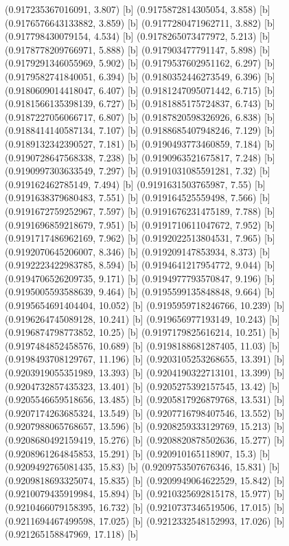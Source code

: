 {{{(0.917235367016091, 3.807) [b] 
(0.9175872814305054, 3.858) [b] 
(0.9176576643133882, 3.859) [b] 
(0.9177280471962711, 3.882) [b] 
(0.917798430079154, 4.534) [b] 
(0.9178265073477972, 5.213) [b] 
(0.9178778209766971, 5.888) [b] 
(0.917903477791147, 5.898) [b] 
(0.9179291346055969, 5.902) [b] 
(0.9179537602951162, 6.297) [b] 
(0.9179582741840051, 6.394) [b] 
(0.9180352446273549, 6.396) [b] 
(0.9180609014418047, 6.407) [b] 
(0.9181247095071442, 6.715) [b] 
(0.9181566135398139, 6.727) [b] 
(0.9181885175724837, 6.743) [b] 
(0.9187227056066717, 6.807) [b] 
(0.9187820598326926, 6.838) [b] 
(0.9188414140587134, 7.107) [b] 
(0.9188685407948246, 7.129) [b] 
(0.9189132342390527, 7.181) [b] 
(0.9190493773460859, 7.184) [b] 
(0.9190728647568338, 7.238) [b] 
(0.9190963521675817, 7.248) [b] 
(0.9190997303633549, 7.297) [b] 
(0.9191031085591281, 7.32) [b] 
(0.919162462785149, 7.494) [b] 
(0.9191631503765987, 7.55) [b] 
(0.9191638379680483, 7.551) [b] 
(0.919164525559498, 7.566) [b] 
(0.9191672759252967, 7.597) [b] 
(0.9191676231475189, 7.788) [b] 
(0.9191696859218679, 7.951) [b] 
(0.9191710611047672, 7.952) [b] 
(0.9191717486962169, 7.962) [b] 
(0.9192022513804531, 7.965) [b] 
(0.9192070645206007, 8.346) [b] 
(0.919209147853934, 8.373) [b] 
(0.9192223422983785, 8.594) [b] 
(0.9194641217954772, 9.044) [b] 
(0.9194706526209735, 9.171) [b] 
(0.9194977793570847, 9.196) [b] 
(0.9195005593588639, 9.464) [b] 
(0.9195599135848848, 9.664) [b] 
(0.9195654691404404, 10.052) [b] 
(0.9195959718246766, 10.239) [b] 
(0.9196264745089128, 10.241) [b] 
(0.919656977193149, 10.243) [b] 
(0.9196874798773852, 10.25) [b] 
(0.9197179825616214, 10.251) [b] 
(0.9197484852458576, 10.689) [b] 
(0.9198188681287405, 11.03) [b] 
(0.9198493708129767, 11.196) [b] 
(0.9203105253268655, 13.391) [b] 
(0.9203919055351989, 13.393) [b] 
(0.9204190322713101, 13.399) [b] 
(0.9204732857435323, 13.401) [b] 
(0.9205275392157545, 13.42) [b] 
(0.9205546659518656, 13.485) [b] 
(0.9205817926879768, 13.531) [b] 
(0.9207174263685324, 13.549) [b] 
(0.9207716798407546, 13.552) [b] 
(0.9207988065768657, 13.596) [b] 
(0.9208259333129769, 15.213) [b] 
(0.9208680492159419, 15.276) [b] 
(0.9208820878502636, 15.277) [b] 
(0.9208961264845853, 15.291) [b] 
(0.920910165118907, 15.3) [b] 
(0.9209492765081435, 15.83) [b] 
(0.9209753507676346, 15.831) [b] 
(0.9209818693325074, 15.835) [b] 
(0.9209949064622529, 15.842) [b] 
(0.9210079435919984, 15.894) [b] 
(0.9210325692815178, 15.977) [b] 
(0.9210466079158395, 16.732) [b] 
(0.9210737346519506, 17.015) [b] 
(0.9211694467499598, 17.025) [b] 
(0.9212332548152993, 17.026) [b] 
(0.921265158847969, 17.118) [b] 
}}}
